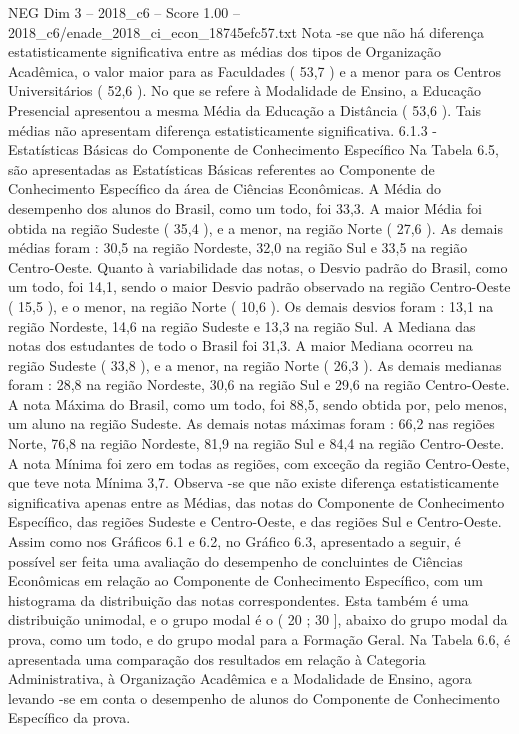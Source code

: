 \begin{textsample}{NEG Dim 3 – 2018\_c6 – Score 1.00 – 2018\_c6/enade\_2018\_ci\_econ\_18745efc57.txt}
Nota -se que não há diferença estatisticamente significativa entre as médias dos tipos de Organização Acadêmica, o valor maior para as Faculdades ( 53,7 ) e a menor para os Centros Universitários ( 52,6 ).
No que se refere à Modalidade de Ensino, a Educação Presencial apresentou a mesma Média da Educação a Distância ( 53,6 ).
Tais médias não apresentam diferença estatisticamente significativa. 6.1.3 - Estatísticas Básicas do Componente de Conhecimento Específico Na Tabela 6.5, são apresentadas as Estatísticas Básicas referentes ao Componente de Conhecimento Específico da área de Ciências Econômicas.
A Média do desempenho dos alunos do Brasil, como um todo, foi 33,3.
A maior Média foi obtida na região Sudeste ( 35,4 ), e a menor, na região Norte ( 27,6 ).
As demais médias foram : 30,5 na região Nordeste, 32,0 na região Sul e 33,5 na região Centro-Oeste.
Quanto à variabilidade das notas, o Desvio padrão do Brasil, como um todo, foi 14,1, sendo o maior Desvio padrão observado na região Centro-Oeste ( 15,5 ), e o menor, na região Norte ( 10,6 ).
Os demais desvios foram : 13,1 na região Nordeste, 14,6 na região Sudeste e 13,3 na região Sul.
A Mediana das notas dos estudantes de todo o Brasil foi 31,3.
A maior Mediana ocorreu na região Sudeste ( 33,8 ), e a menor, na região Norte ( 26,3 ).
As demais medianas foram : 28,8 na região Nordeste, 30,6 na região Sul e 29,6 na região Centro-Oeste.
A nota Máxima do Brasil, como um todo, foi 88,5, sendo obtida por, pelo menos, um aluno na região Sudeste.
As demais notas máximas foram : 66,2 nas regiões Norte, 76,8 na região Nordeste, 81,9 na região Sul e 84,4 na região Centro-Oeste.
A nota Mínima foi zero em todas as regiões, com exceção da região Centro-Oeste, que teve nota Mínima 3,7.
Observa -se que não existe diferença estatisticamente significativa apenas entre as Médias, das notas do Componente de Conhecimento Específico, das regiões Sudeste e Centro-Oeste, e das regiões Sul e Centro-Oeste.
Assim como nos Gráficos 6.1 e 6.2, no Gráfico 6.3, apresentado a seguir, é possível ser feita uma avaliação do desempenho de concluintes de Ciências Econômicas em relação ao Componente de Conhecimento Específico, com um histograma da distribuição das notas correspondentes.
Esta também é uma distribuição unimodal, e o grupo modal é o ( 20 ; 30 ], abaixo do grupo modal da prova, como um todo, e do grupo modal para a Formação Geral.
Na Tabela 6.6, é apresentada uma comparação dos resultados em relação à Categoria Administrativa, à Organização Acadêmica e a Modalidade de Ensino, agora levando -se em conta o desempenho de alunos do Componente de Conhecimento Específico da prova.

\end{textsample}
